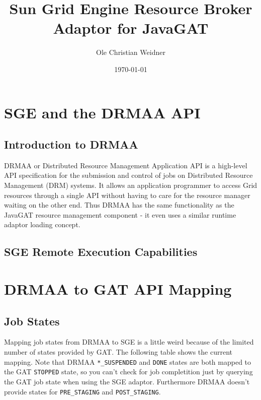 \documentclass[bibtotocnumbered, headsepline,normalheadings]{scrreprt}
\begin{document}
		\title{Sun Grid Engine Resource Broker Adaptor for JavaGAT}
		\author{Ole Christian Weidner}
		\date{\today}
		\maketitle
		\tableofcontents

\chapter{SGE and the DRMAA API}

\section{Introduction to DRMAA}
DRMAA or Distributed Resource Management Application API is a high-level API specification for the submission and control of jobs on Distributed Resource Management (DRM) systems. It allows an application programmer to access Grid resources through a single API without having to care for the resource manager waiting on the other end. Thus DRMAA has the same functionality as the JavaGAT resource management component - it even uses a similar runtime adaptor loading concept.

\section{SGE Remote Execution Capabilities}


\chapter{DRMAA to GAT API Mapping}

\section{Job States}
Mapping job states from DRMAA to SGE is a little weird because of the limited number of states provided by GAT. The following table shows the current mapping. Note that DRMAA \texttt{*\_SUSPENDED} and \texttt{DONE} states are both mapped to the GAT \texttt{STOPPED} state, so you can't check for job completition just by querying the GAT job state when using the SGE adaptor. Furthermore DRMAA doesn't provide states for \texttt{PRE\_STAGING} and \texttt{POST\_STAGING}.
\end{document}
